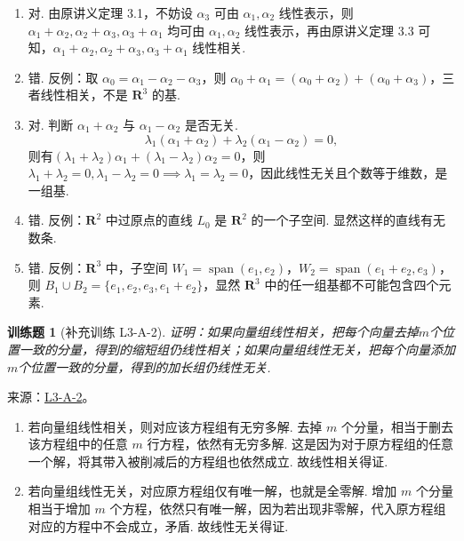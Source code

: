 \documentclass[UTF8,12pt,a4paper,fontset=fandol]{ctexart}
\newtheorem{exercise}{训练题}[section]
\begin{document}
\begin{solve}
\begin{enumerate}
                \item 对. 由原讲义定理 3.1，不妨设 $\alpha_3$ 可由 $\alpha_1,\alpha_2$ 线性表示，则 $\alpha_1+\alpha_2,\alpha_2+\alpha_3,\alpha_3+\alpha_1$ 均可由 $\alpha_1,\alpha_2$ 线性表示，再由原讲义定理 3.3 可知，$\alpha_1+\alpha_2,\alpha_2+\alpha_3,\alpha_3+\alpha_1$ 线性相关.

                \item 错. 反例：取 $\alpha_0=\alpha_1-\alpha_2-\alpha_3$，则 $\alpha_0+\alpha_1=(\alpha_0+\alpha_2)+(\alpha_0+\alpha_3)$，三者线性相关，不是 $\mathbf{R}^3$ 的基.

                \item 对. 判断 $\alpha_1+\alpha_2$ 与 $\alpha_1-\alpha_2$ 是否无关.
                    \[\lambda_1(\alpha_1+\alpha_2)+\lambda_2(\alpha_1-\alpha_2)=0,\]
                    则有$(\lambda_1+\lambda_2)\alpha_1+(\lambda_1-\lambda_2)\alpha_2=0$，则 $\lambda_1+\lambda_2=0,\lambda_1-\lambda_2=0\implies \lambda_1=\lambda_2=0$，因此线性无关且个数等于维数，是一组基.

                \item 错. 反例：$\mathbf{R}^2$ 中过原点的直线 $L_0$ 是 $\mathbf{R}^2$ 的一个子空间. 显然这样的直线有无数条.

                \item 错. 反例：$\mathbf{R}^3$ 中，子空间 $W_1=\operatorname{span}(e_1,e_2)$，$W_2=\operatorname{span}(e_1+e_2,e_3)$，则 $B_1\cup B_2=\{e_1,e_2,e_3,e_1+e_2\}$，显然 $\mathbf{R}^3$ 中的任一组基都不可能包含四个元素.
            \end{enumerate}
\end{solve}

\begin{exercise}[补充训练 L3-A-2]\label{prob:L3-A-2}
证明：如果向量组线性相关，把每个向量去掉$m$个位置一致的分量，得到的缩短组仍线性相关；如果向量组线性无关，把每个向量添加$m$个位置一致的分量，得到的加长组仍线性无关.
\end{exercise}
\noindent 来源：\href{https://github.com/yhwu-is/Linear-Algebra-Left-Undone/blob/new/%E8%AE%B2%E4%B9%89/%E4%B8%93%E9%A2%98/3%20%E6%9C%89%E9%99%90%E7%BB%B4%E7%BA%BF%E6%80%A7%E7%A9%BA%E9%97%B4.tex}{L3-A-2}。
\begin{solve}
\begin{enumerate}
                \item 若向量组线性相关，则对应该方程组有无穷多解. 去掉 $m$ 个分量，相当于删去该方程组中的任意 $m$ 行方程，依然有无穷多解. 这是因为对于原方程组的任意一个解，将其带入被削减后的方程组也依然成立. 故线性相关得证.

                \item 若向量组线性无关，对应原方程组仅有唯一解，也就是全零解. 增加 $m$ 个分量相当于增加 $m$ 个方程，依然只有唯一解，因为若出现非零解，代入原方程组对应的方程中不会成立，矛盾. 故线性无关得证.
            \end{enumerate}
\end{solve}
\end{document}
